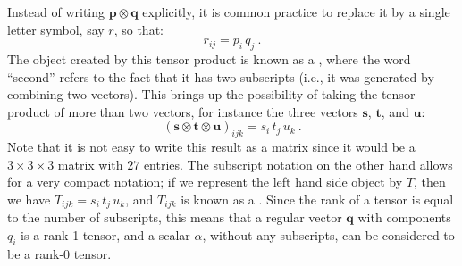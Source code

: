 Instead of writing $\mathbf{p}\otimes\mathbf{q}$ explicitly, it is common practice to replace it by a single letter symbol, say $r$, so that:
\begin{equation}
	r_{ij} = p_i\, q_j\ .
\end{equation}
The object created by this tensor product is known as a , where the word ``second'' refers to the fact that it has two subscripts (i.e., it was generated by combining two vectors). This brings up the possibility of taking the tensor product of more than two vectors, for instance the three vectors $\mathbf{s}$, $\mathbf{t}$, and $\mathbf{u}$:
\begin{equation}
	(\mathbf{s}\otimes\mathbf{t}\otimes\mathbf{u})_{ijk} = s_i\,t_j\,u_k\ .
\end{equation}
Note that it is not easy to write this result as a matrix since it would be a $3\times 3\times 3$ matrix with $27$ entries. The subscript notation on the other hand allows for a very compact notation; if we represent the left hand side object by $T$, then we have $T_{ijk}=s_i\,t_j\,u_k$, and $T_{ijk}$ is known as a .  Since the rank of a tensor is equal to the number of subscripts, this means that a regular vector $\mathbf{q}$ with components $q_i$ is a rank-1 tensor, and a scalar $\alpha$, without any subscripts, can be considered to be a rank-0 tensor.

